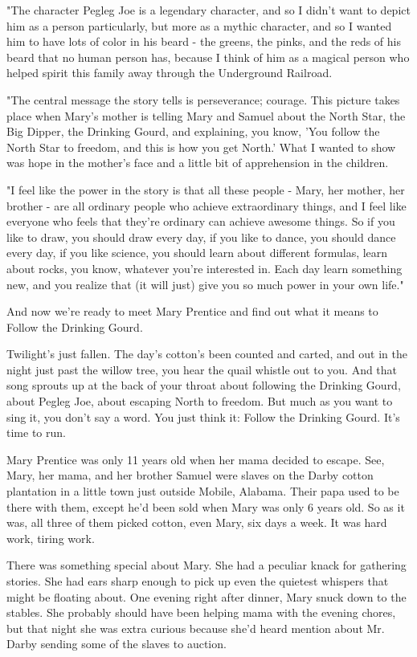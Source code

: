 "The character Pegleg Joe is a legendary character, and so I didn't want to depict him as a person particularly, but more as a mythic character, and so I wanted him to have lots of color in his beard - the greens, the pinks, and the reds of his beard that no human person has, because I think of him as a magical person who helped spirit this family away through the Underground Railroad.

"The central message the story tells is perseverance; courage. This picture takes place when Mary's mother is telling Mary and Samuel about the North Star, the Big Dipper, the Drinking Gourd, and explaining, you know, 'You follow the North Star to freedom, and this is how you get North.' What I wanted to show was hope in the mother's face and a little bit of apprehension in the children.

"I feel like the power in the story is that all these people - Mary, her mother, her brother - are all ordinary people who achieve extraordinary things, and I feel like everyone who feels that they're ordinary can achieve awesome things. So if you like to draw, you should draw every day, if you like to dance, you should dance every day, if you like science, you should learn about different formulas, learn about rocks, you know, whatever you're interested in. Each day learn something new, and you realize that (it will just) give you so much power in your own life."

And now we're ready to meet Mary Prentice and find out what it means to Follow the Drinking Gourd.

Twilight's just fallen. The day's cotton's been counted and carted, and out in the night just past the willow tree, you hear the quail whistle out to you. And that song sprouts up at the back of your throat about following the Drinking Gourd, about Pegleg Joe, about escaping North to freedom. But much as you want to sing it, you don't say a word. You just think it: Follow the Drinking Gourd. It's time to run.

Mary Prentice was only 11 years old when her mama decided to escape. See, Mary, her mama, and her brother Samuel were slaves on the Darby cotton plantation in a little town just outside Mobile, Alabama. Their papa used to be there with them, except he'd been sold when Mary was only 6 years old. So as it was, all three of them picked cotton, even Mary, six days a week. It was hard work, tiring work.

There was something special about Mary. She had a peculiar knack for gathering stories. She had ears sharp enough to pick up even the quietest whispers that might be floating about. One evening right after dinner, Mary snuck down to the stables. She probably should have been helping mama with the evening chores, but that night she was extra curious because she'd heard mention about Mr. Darby sending some of the slaves to auction.

